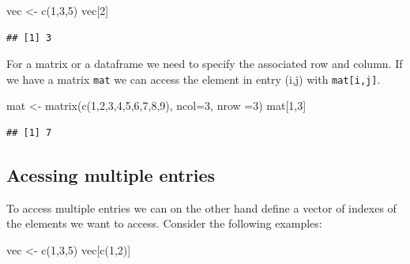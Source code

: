 \documentclass[
]{book}
\newenvironment{Shaded}{\begin{snugshade}}{\end{snugshade}}
\newcommand{\AttributeTok}[1]{\textcolor[rgb]{0.77,0.63,0.00}{#1}}
\newcommand{\DecValTok}[1]{\textcolor[rgb]{0.00,0.00,0.81}{#1}}
\newcommand{\FunctionTok}[1]{\textcolor[rgb]{0.00,0.00,0.00}{#1}}
\newcommand{\NormalTok}[1]{#1}
\newcommand{\OtherTok}[1]{\textcolor[rgb]{0.56,0.35,0.01}{#1}}
\begin{document}
\begin{Shaded}
\begin{Highlighting}[]
\NormalTok{vec }\OtherTok{\textless{}{-}} \FunctionTok{c}\NormalTok{(}\DecValTok{1}\NormalTok{,}\DecValTok{3}\NormalTok{,}\DecValTok{5}\NormalTok{)}
\NormalTok{vec[}\DecValTok{2}\NormalTok{]}
\end{Highlighting}
\end{Shaded}

\begin{verbatim}
## [1] 3
\end{verbatim}

For a matrix or a dataframe we need to specify the associated row and column. If we have a matrix \texttt{mat} we can access the element in entry (i,j) with \texttt{mat{[}i,j{]}}.

\begin{Shaded}
\begin{Highlighting}[]
\NormalTok{mat }\OtherTok{\textless{}{-}} \FunctionTok{matrix}\NormalTok{(}\FunctionTok{c}\NormalTok{(}\DecValTok{1}\NormalTok{,}\DecValTok{2}\NormalTok{,}\DecValTok{3}\NormalTok{,}\DecValTok{4}\NormalTok{,}\DecValTok{5}\NormalTok{,}\DecValTok{6}\NormalTok{,}\DecValTok{7}\NormalTok{,}\DecValTok{8}\NormalTok{,}\DecValTok{9}\NormalTok{), }\AttributeTok{ncol=}\DecValTok{3}\NormalTok{, }\AttributeTok{nrow =}\DecValTok{3}\NormalTok{)}
\NormalTok{mat[}\DecValTok{1}\NormalTok{,}\DecValTok{3}\NormalTok{]}
\end{Highlighting}
\end{Shaded}

\begin{verbatim}
## [1] 7
\end{verbatim}

\hypertarget{acessing-multiple-entries}{%
\subsection{Acessing multiple entries}\label{acessing-multiple-entries}}

To access multiple entries we can on the other hand define a vector of indexes of the elements we want to access. Consider the following examples:

\begin{Shaded}
\begin{Highlighting}[]
\NormalTok{vec }\OtherTok{\textless{}{-}} \FunctionTok{c}\NormalTok{(}\DecValTok{1}\NormalTok{,}\DecValTok{3}\NormalTok{,}\DecValTok{5}\NormalTok{)}
\NormalTok{vec[}\FunctionTok{c}\NormalTok{(}\DecValTok{1}\NormalTok{,}\DecValTok{2}\NormalTok{)]}
\end{Highlighting}
\end{Shaded}
\end{document}
